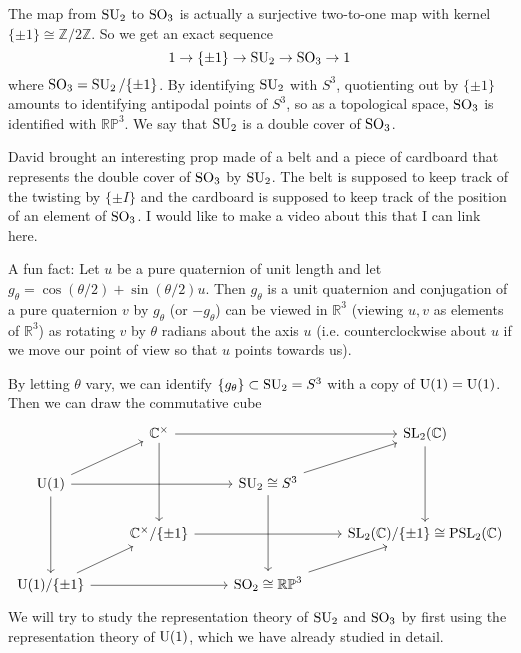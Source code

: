 \documentclass[../../rtnotes.tex]{subfiles}
\begin{document}
The map from $\operatorname{SU}_2$ to $\operatorname{SO}_3$ is actually a surjective two-to-one map with kernel $\{\pm 1\}\cong\mathbb Z/2\mathbb Z$. So we get an exact sequence 
\[1\to \{\pm 1\}\to \operatorname{SU}_2\to\operatorname{SO}_3\to 1\]
where $\operatorname{SO}_3 = \operatorname{SU}_2/\{\pm 1\}$. By identifying $\operatorname{SU}_2$ with $S^3$, quotienting out by $\{\pm 1\}$ amounts to identifying antipodal points of $S^3$, so as a topological space, $\operatorname{SO}_3$ is identified with $\mathbb{RP}^3$. We say that $\operatorname{SU}_2$ is a double cover of $\operatorname{SO}_3$.

David brought an interesting prop made of a belt and a piece of cardboard that represents the double cover of $\operatorname{SO}_3$ by $\operatorname{SU}_2$. The belt is supposed to keep track of the twisting by $\{\pm I\}$ and the cardboard is supposed to keep track of the position of an element of $\operatorname{SO}_3$. I would like to make a video about this that I can link here. 

A fun fact: Let $u$ be a pure quaternion of unit length and let $g_\theta = \cos(\theta/2) + \sin(\theta/2)u$. Then $g_\theta$ is a unit quaternion and conjugation of a pure quaternion $v$ by $g_\theta$ (or $-g_\theta$) can be viewed in $\mathbb R^3$ (viewing $u,v$ as elements of $\mathbb R^3$) as rotating $v$ by $\theta$ radians about the axis $u$ (i.e. counterclockwise about $u$ if we move our point of view so that $u$ points towards us).

By letting $\theta$ vary, we can identify $\{g_\theta\}\subset \operatorname{SU}_2 = S^3$ with a copy of $\operatorname{U}(1)=\operatorname{U}(1)$. Then we can draw the commutative cube
\[\begin{tikzcd}[ampersand replacement=\&]
	\& {\mathbb C^\times} \&\& {\SL_2(\mathbb C)} \\
	{\U(1)} \&\& {\SU_2\cong S^3} \\
	\& {\mathbb C^\times/\{\pm 1\}} \&\& {\SL_2(\mathbb C)/\{\pm 1\}\cong \PSL_2(\mathbb C)} \\
	{\U(1)/\{\pm 1\}} \&\& {\SO_2\cong \mathbb{RP}^3}
	\arrow[from=1-2, to=1-4]
	\arrow[from=1-2, to=3-2]
	\arrow[from=1-4, to=3-4]
	\arrow[from=2-1, to=1-2]
	\arrow[from=2-1, to=2-3]
	\arrow[from=2-1, to=4-1]
	\arrow[from=2-3, to=1-4]
	\arrow[from=2-3, to=4-3]
	\arrow[from=3-2, to=3-4]
	\arrow[from=4-1, to=3-2]
	\arrow[from=4-1, to=4-3]
	\arrow[from=4-3, to=3-4]
\end{tikzcd}\]
We will try to study the representation theory of $\operatorname{SU}_2$ and $\operatorname{SO}_3$ by first using the representation theory of $\operatorname{U}(1)$, which we have already studied in detail.
\end{document}
